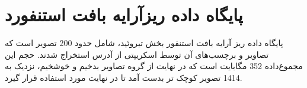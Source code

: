 \section{پایگاه داده ریزآرایه بافت استنفورد}\label{subsec:پایگاه-داده-ریزآرایه-بافت-استنفورد}
پایگاه داده ریز آرایه بافت استنفور\cite{marinelli2007stanford} بخش تیروئید، شامل حدود 200 تصویر است که تصاویر و برچسب‌های آن توسط اسکریپتی از آدرس \cite{stanfortissuemicroarray} استخراج شدند. حجم این مجموع‌داده 352 مگابایت است که در نهایت از گروه تصاویر بدخیم و خوشخیم، نزدیک به 1414 تصویر کوچک تر بدست آمد تا در نهایت مورد استفاده قرار گیرد.

